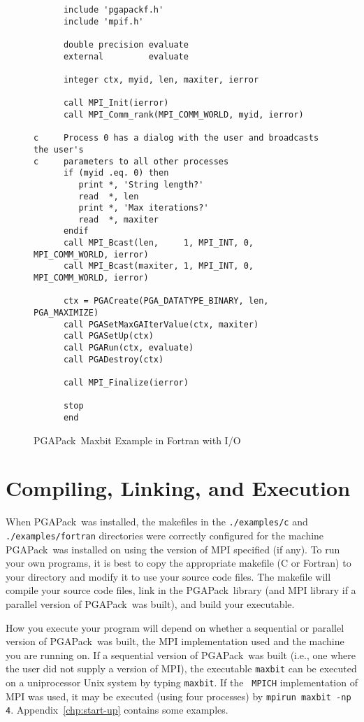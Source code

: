 \documentclass{report}
\newcommand{\pga}{PGAPack}
\begin{document}
\begin{figure}
\begin{verbatim}
      include 'pgapackf.h'
      include 'mpif.h'

      double precision evaluate
      external         evaluate

      integer ctx, myid, len, maxiter, ierror

      call MPI_Init(ierror)
      call MPI_Comm_rank(MPI_COMM_WORLD, myid, ierror)

c     Process 0 has a dialog with the user and broadcasts the user's 
c     parameters to all other processes
      if (myid .eq. 0) then
         print *, 'String length?'
         read  *, len
         print *, 'Max iterations?'
         read  *, maxiter
      endif
      call MPI_Bcast(len,     1, MPI_INT, 0, MPI_COMM_WORLD, ierror)
      call MPI_Bcast(maxiter, 1, MPI_INT, 0, MPI_COMM_WORLD, ierror)

      ctx = PGACreate(PGA_DATATYPE_BINARY, len, PGA_MAXIMIZE)
      call PGASetMaxGAIterValue(ctx, maxiter)
      call PGASetUp(ctx)
      call PGARun(ctx, evaluate)
      call PGADestroy(ctx)

      call MPI_Finalize(ierror)

      stop
      end
\end{verbatim}
\caption{\pga\ Maxbit Example in Fortran with I/O}
\label{example:parallel-simple-main-f77}
\end{figure}

\section{Compiling, Linking, and Execution}\label{sec:execute}

When \pga\ was installed, the makefiles in the {\tt ./examples/c} and {\tt
./examples/fortran} directories were correctly configured for the machine
\pga\ was installed on using the version of MPI specified (if any).  To run
your own programs, it is best to copy the appropriate makefile (C or Fortran)
to your directory and modify it to use your source code files.  The makefile
will compile your source code files, link in the \pga\ library (and MPI
library if a parallel version of \pga\ was built), and build your executable.

How you execute your program will depend on whether a sequential or parallel
version of \pga\ was built, the MPI implementation used and the machine you
are running on.  If a sequential version of \pga\ was built (i.e., one where
the user did not supply a version of MPI), the executable {\tt maxbit} can be
executed on a uniprocessor Unix system by typing {\tt maxbit}.  If the {\tt
MPICH} implementation of MPI was used, it may be executed (using four
processes) by {\tt mpirun maxbit -np 4}. Appendix~\ref{chp:start-up} contains
some examples.
\end{document}
